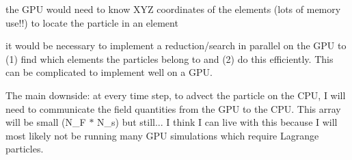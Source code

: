 \begin{DoxyItemize}
\item the G\-P\-U would need to know X\-Y\-Z coordinates of the elements (lots of memory use!!) to locate the particle in an element
\item it would be necessary to implement a reduction/search in parallel on the G\-P\-U to (1) find which elements the particles belong to and (2) do this efficiently. This can be complicated to implement well on a G\-P\-U.
\item The main downside\-: at every time step, to advect the particle on the C\-P\-U, I will need to communicate the field quantities from the G\-P\-U to the C\-P\-U. This array will be small (N\-\_\-\-F $\ast$ N\-\_\-s) but still... I think I can live with this because I will most likely not be running many G\-P\-U simulations which require Lagrange particles. 
\end{DoxyItemize}